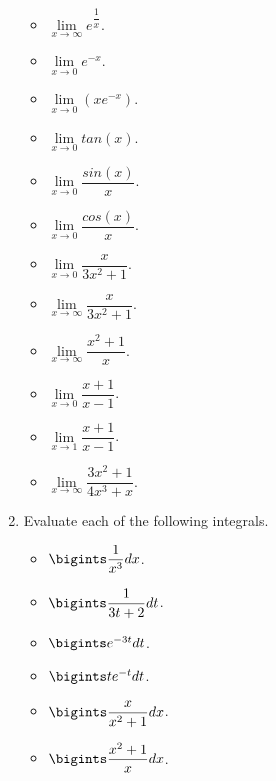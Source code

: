 \documentclass[fleqn]{article}
\begin{document}
\begin{enumerate}
\begin{itemize}
      \item $\lim\limits_{x \to \infty} e^{\dfrac{1}{x}}$. 

      \item $\lim\limits_{x \to 0} e^{-x}$. 

      \item $\lim\limits_{x \to 0} \left(x e^{-x}\right)$.
      
      \item $\lim\limits_{x \to 0} tan(x)$. 

      \item $\lim\limits_{x \to 0} \dfrac{sin(x)}{x}$. 

      \item $\lim\limits_{x \to 0} \dfrac{cos(x)}{x}$. 

      \item $\lim\limits_{x \to 0} \dfrac{x}{3x^2+1}$.
      
      \item $\lim\limits_{x \to \infty} \dfrac{x}{3x^2+1}$. 

      \item $\lim\limits_{x \to \infty} \dfrac{x^2+1}{x}$. 

      \item $\lim\limits_{x \to 0} \dfrac{x+1}{x-1}$. 

      \item $\lim\limits_{x \to 1} \dfrac{x+1}{x-1}$.
      
      \item $\lim\limits_{x \to \infty} \dfrac{3x^2+1}{4x^3+x}$. 
    \end{itemize}

    \item Evaluate each of the following integrals. 
    \begin{itemize}
      \item $\bigints \dfrac{1}{x^3} dx$.

      \item $\bigints \dfrac{1}{3t+2} dt$.

      \item $\bigints e^{-3t} dt$.

      \item $\bigints t e^{-t} dt$.

      \item $\bigints \dfrac{x}{x^2+1} dx$.

      \item $\bigints \dfrac{x^2+1}{x} dx$.


\end{itemize}
\end{enumerate}
\end{document}
